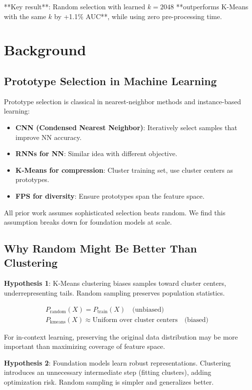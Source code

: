 \documentclass[11pt,a4paper]{article}
\begin{document}
**Key result**: Random selection with learned $k=2048$ **outperforms K-Means with the same $k$ by +1.1\% AUC**, while using zero pre-processing time.

\section{Background}

\subsection{Prototype Selection in Machine Learning}

Prototype selection is classical in nearest-neighbor methods and instance-based learning:

\begin{itemize}
\item \textbf{CNN (Condensed Nearest Neighbor)}: Iteratively select samples that improve NN accuracy.
\item \textbf{RNNs for NN}: Similar idea with different objective.
\item \textbf{K-Means for compression}: Cluster training set, use cluster centers as prototypes.
\item \textbf{FPS for diversity}: Ensure prototypes span the feature space.
\end{itemize}

All prior work assumes sophisticated selection beats random. We find this assumption breaks down for foundation models at scale.

\subsection{Why Random Might Be Better Than Clustering}

\textbf{Hypothesis 1}: K-Means clustering biases samples toward cluster centers, underrepresenting tails. Random sampling preserves population statistics.

\begin{align}
P_{\text{random}}(X) = P_{\text{train}}(X) \quad \text{(unbiased)} \\
P_{\text{kmeans}}(X) \approx \text{Uniform over cluster centers} \quad \text{(biased)}
\end{align}

For in-context learning, preserving the original data distribution may be more important than maximizing coverage of feature space.

\textbf{Hypothesis 2}: Foundation models learn robust representations. Clustering introduces an unnecessary intermediate step (fitting clusters), adding optimization risk. Random sampling is simpler and generalizes better.
\end{document}
